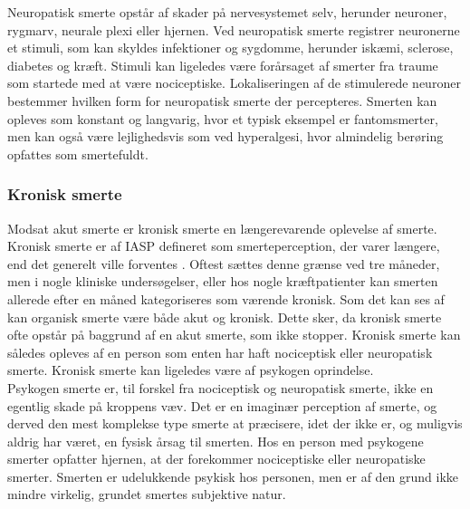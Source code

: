 Neuropatisk smerte opstår af skader på nervesystemet selv, herunder neuroner, rygmarv, neurale plexi eller hjernen. 
Ved neuropatisk smerte registrer neuronerne et stimuli, som kan skyldes infektioner og sygdomme, herunder iskæmi, sclerose, diabetes og kræft. Stimuli kan ligeledes være forårsaget af smerter fra traume som startede med at være nociceptiske. Lokaliseringen af de stimulerede neuroner bestemmer hvilken form for neuropatisk smerte der percepteres. Smerten kan opleves som konstant og langvarig, hvor et typisk eksempel er fantomsmerter, men kan også være lejlighedsvis som ved hyperalgesi, hvor almindelig berøring opfattes som smertefuldt. \citep{Giangregorio1997} \citep{Carmon}

\subsubsection{Kronisk smerte}
Modsat akut smerte er kronisk smerte en længerevarende oplevelse af smerte. Kronisk smerte er af IASP defineret som smerteperception, der varer længere, end det generelt ville forventes \citep{Carmon}. Oftest sættes denne grænse ved tre måneder, men i nogle kliniske undersøgelser, eller hos nogle kræftpatienter kan smerten allerede efter en måned kategoriseres som værende kronisk. Som det kan ses af  kan organisk smerte være både akut og kronisk. Dette sker, da kronisk smerte ofte opstår på baggrund af en akut smerte, som ikke stopper. Kronisk smerte kan således opleves af en person som enten har haft nociceptisk eller neuropatisk smerte. Kronisk smerte kan ligeledes være af psykogen oprindelse.\\
Psykogen smerte er, til forskel fra nociceptisk og neuropatisk smerte, ikke en egentlig skade på kroppens væv. Det er en imaginær perception af smerte, og derved den mest komplekse type smerte at præcisere, idet der ikke er, og muligvis aldrig har været, en fysisk årsag til smerten. Hos en person med psykogene smerter opfatter hjernen, at der forekommer nociceptiske eller neuropatiske smerter. Smerten er udelukkende psykisk hos personen, men er af den grund ikke mindre virkelig, grundet smertes subjektive natur. \citep{Giangregorio1997}


